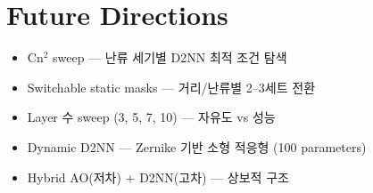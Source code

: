 \documentclass[11pt,a4paper]{article}
\begin{document}
\section{Future Directions}

\begin{itemize}
\item Cn$^2$ sweep --- 난류 세기별 D2NN 최적 조건 탐색
\item Switchable static masks --- 거리/난류별 2--3세트 전환
\item Layer 수 sweep (3, 5, 7, 10) --- 자유도 vs 성능
\item Dynamic D2NN --- Zernike 기반 소형 적응형 (100 parameters)
\item Hybrid AO(저차) + D2NN(고차) --- 상보적 구조
\end{itemize}
\end{document}
